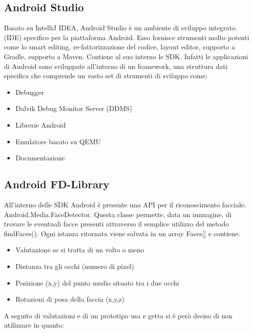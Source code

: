 \subsection{Android Studio}

Basato su IntelliJ IDEA, Android Studio è un ambiente di sviluppo integrato (IDE) specifico per la piattaforma Android. Esso fornisce strumenti molto potenti come lo smart editing, re-fattorizzazione del codice, layout editor, supporto a Gradle, supporto a Maven. Contiene al suo interno le SDK. Infatti le applicazioni di Android sono sviluppate all'interno di un framework, una struttura dati specifica che comprende un vasto set di strumenti di sviluppo come:

\begin{itemize}
\item Debugger
\item Dalvik Debug Monitor Server (DDMS)
\item Librerie Android
\item Emulatore basato su QEMU
\item Documentazione
\end{itemize}

\subsection{Android FD-Library}

All'interno delle SDK Android è presente una API per il riconoscimento facciale: Android.Media.FaceDetector. Questa classe permette, data un immagine, di trovare le eventuali facce presenti attraverso il semplice utilizzo del metodo findFaces(). Ogni istanza ritornata viene salvata in un array Faces[] e contiene:

\begin{itemize}
\item Valutazione se si tratta di un volto o meno 
\item Distanza tra gli occhi (numero di pixel)
\item Posizione (x,y) del punto medio situato tra i due occhi
\item Rotazioni di posa della faccia (x,y,z)
\end{itemize} 

A seguito di valutazioni e di un prototipo usa e getta si è però deciso di non utilizzare in quanto:

